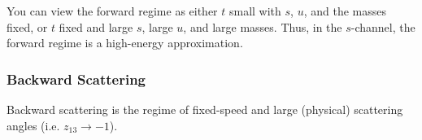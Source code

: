 You can view the forward regime as either $t$ small with $s$, $u$, and the masses fixed, or $t$ fixed and large $s$, large $u$, and large masses. Thus, in the $s$-channel, the forward regime is a high-energy approximation.
\subsubsection{Backward Scattering}
Backward scattering is the regime of fixed-speed and large (physical) scattering angles (i.e. $z_{13} \rightarrow -1$).
